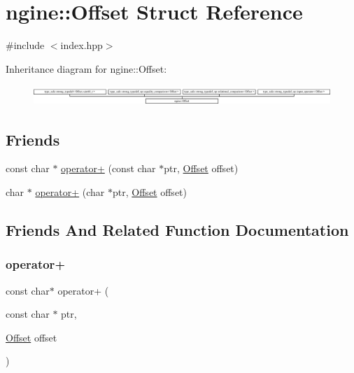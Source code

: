 \hypertarget{structngine_1_1Offset}{}\section{ngine\+:\+:Offset Struct Reference}
\label{structngine_1_1Offset}


{\ttfamily \#include $<$index.\+hpp$>$}

Inheritance diagram for ngine\+:\+:Offset\+:\begin{figure}[H]
\begin{center}
\leavevmode
\includegraphics[height=0.748663cm]{structngine_1_1Offset}
\end{center}
\end{figure}
\subsection*{Friends}
\begin{DoxyCompactItemize}
\item 
const char $\ast$ \hyperlink{structngine_1_1Offset_aaed86d39530be98502fa1560b323d07b}{operator+} (const char $\ast$ptr, \hyperlink{structngine_1_1Offset}{Offset} offset)
\item 
char $\ast$ \hyperlink{structngine_1_1Offset_aec6c323c060e7a7cae481422f1ecea7a}{operator+} (char $\ast$ptr, \hyperlink{structngine_1_1Offset}{Offset} offset)
\end{DoxyCompactItemize}


\subsection{Friends And Related Function Documentation}
\mbox{\label{structngine_1_1Offset_aaed86d39530be98502fa1560b323d07b}} 
\subsubsection{\texorpdfstring{operator+}{operator+}\hspace{0.1cm}{\footnotesize\ttfamily [1/2]}}
{\footnotesize\ttfamily const char$\ast$ operator+ (\begin{DoxyParamCaption}\item[{const char $\ast$}]{ptr,  }\item[{\hyperlink{structngine_1_1Offset}{Offset}}]{offset }\end{DoxyParamCaption})\hspace{0.3cm}{\ttfamily [friend]}}

